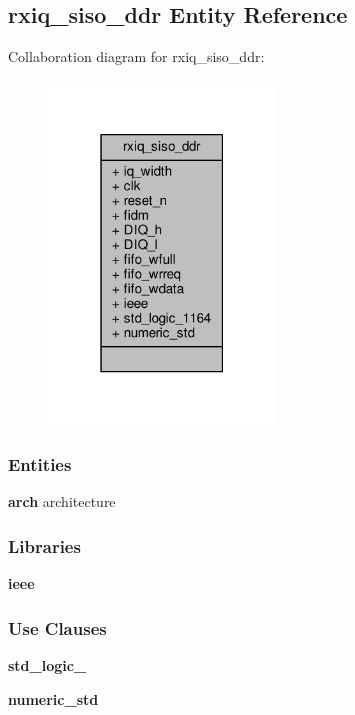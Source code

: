 \subsection{rxiq\+\_\+siso\+\_\+ddr Entity Reference}
\label{classrxiq__siso__ddr}


Collaboration diagram for rxiq\+\_\+siso\+\_\+ddr\+:\nopagebreak
\begin{figure}[H]
\begin{center}
\leavevmode
\includegraphics[width=171pt]{d3/dd0/classrxiq__siso__ddr__coll__graph}
\end{center}
\end{figure}
\subsubsection*{Entities}
\begin{DoxyCompactItemize}
\item 
{\bf arch} architecture
\end{DoxyCompactItemize}
\subsubsection*{Libraries}
 \begin{DoxyCompactItemize}
\item 
{\bf ieee} 
\end{DoxyCompactItemize}
\subsubsection*{Use Clauses}
 \begin{DoxyCompactItemize}
\item 
{\bf std\+\_\+logic\+\_}   
\item 
{\bf numeric\+\_\+std}   
\end{DoxyCompactItemize}
